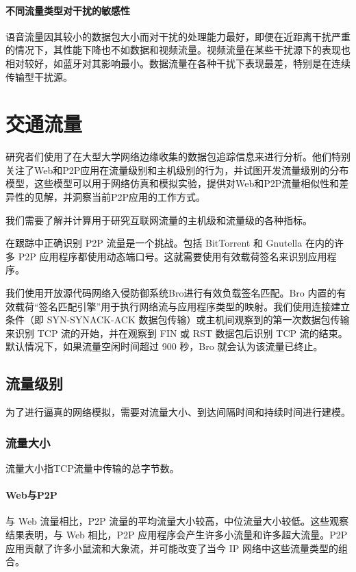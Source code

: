 \subsubsection{不同流量类型对干扰的敏感性}

语音流量因其较小的数据包大小而对干扰的处理能力最好，即便在近距离干扰严重的情况下，其性能下降也不如数据和视频流量。视频流量在某些干扰源下的表现也相对较好，如蓝牙对其影响最小。数据流量在各种干扰下表现最差，特别是在连续传输型干扰源。

\chapter{交通流量}

研究者们使用了在大型大学网络边缘收集的数据包追踪信息来进行分析。他们特别关注了Web和P2P应用在流量级别和主机级别的行为，并试图开发流量级别的分布模型，这些模型可以用于网络仿真和模拟实验，提供对Web和P2P流量相似性和差异性的见解，并洞察当前P2P应用的工作方式。

我们需要了解并计算用于研究互联网流量的主机级和流量级的各种指标。

在跟踪中正确识别 P2P 流量是一个挑战。包括 BitTorrent 和 Gnutella 在内的许多 P2P 应用程序都使用动态端口号。这就需要使用有效载荷签名来识别应用程序。

我们使用开放源代码网络入侵防御系统Bro进行有效负载签名匹配。Bro 内置的有效载荷``签名匹配引擎''用于执行网络流与应用程序类型的映射。我们使用连接建立条件（即 SYN-SYNACK-ACK 数据包传输）或主机间观察到的第一次数据包传输来识别 TCP 流的开始，并在观察到 FIN 或 RST 数据包后识别 TCP 流的结束。默认情况下，如果流量空闲时间超过 900 秒，Bro 就会认为该流量已终止。

\section{流量级别}

为了进行逼真的网络模拟，需要对流量大小、到达间隔时间和持续时间进行建模。

\subsection{流量大小}

流量大小指TCP流量中传输的总字节数。

\subsubsection{Web与P2P}

与 Web 流量相比，P2P 流量的平均流量大小较高，中位流量大小较低。这些观察结果表明，与 Web 相比，P2P 应用程序会产生许多小流量和许多超大流量。P2P 应用贡献了许多小鼠流和大象流，并可能改变了当今 IP 网络中这些流量类型的组合。

